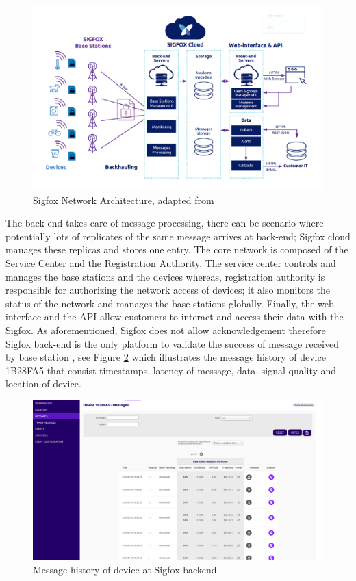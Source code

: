 \documentclass[12pt]{article}
\begin{document}
\begin{figure}[H]
  \includegraphics[width=\textwidth]{Images/sigfox_architecture.pdf}
  \centering
  \caption{Sigfox Network Architecture, adapted from \cite{SigfoxTechnicalDoc}}
  \label{fig:Sigfox Network Architecture}
\end{figure}


The back-end takes care of message processing, there can be scenario where potentially lots of replicates of the same message arrives at back-end; Sigfox cloud manages these replicas and stores one entry. The core network is composed of the Service Center and the Registration Authority. The service center controls and manages the base stations and the devices whereas, registration authority is responsible for authorizing the network access of devices; it also monitors the status of the network and manages the base stations globally. Finally, the web interface and the API allow customers to interact and access their data with the Sigfox. As aforementioned, Sigfox does not allow acknowledgement therefore Sigfox back-end is the only platform to validate the success of message received by base station  \cite{SigfoxTechnicalDoc,gomez2019sigfox}, see Figure \ref{fig:Device's message history at Sigfox backend} which illustrates the message history of device 1B28FA5 that consist timestamps, latency of message, data, signal quality and location of device.

\begin{figure}[h]
    \centering
    \includegraphics[width=0.8\columnwidth]{Images/sigfoxHistory.pdf}
    \caption{Message history of device at Sigfox backend}
    \label{fig:Device's message history at Sigfox backend}
\end{figure}
\end{document}
